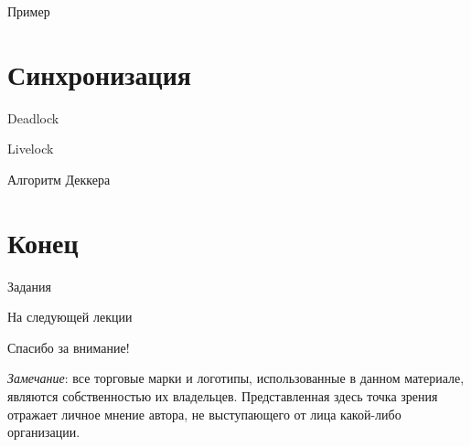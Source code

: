 \begin{frame}{Пример}
\todo
\end{frame}

\section{Синхронизация}

\begin{frame}{Deadlock}
\todo
\end{frame}

\begin{frame}{Livelock}
\todo
\end{frame}

\begin{frame}{Алгоритм Деккера}
\todo
\end{frame}

\section{Конец}

\begin{frame}{Задания}
\end{frame}

\begin{frame}{На следующей лекции}
\end{frame}

\begin{frame}

{\huge{Спасибо за внимание!}\par}

\vfill

\tiny{\textit{Замечание}: все торговые марки и логотипы, использованные в данном материале, являются собственностью их владельцев. Представленная здесь точка зрения отражает личное мнение автора, не выступающего от лица какой-либо организации.}

\end{frame}

